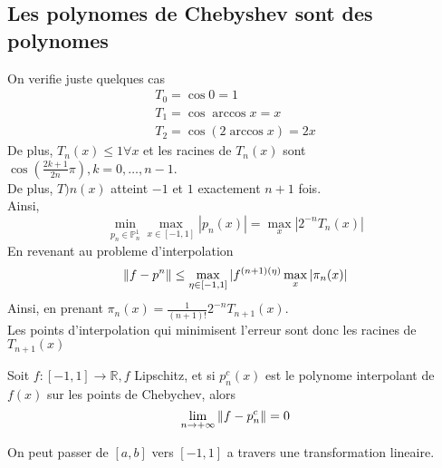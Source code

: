 \documentclass[../main.tex]{subfiles}
\begin{document}
\subsection*{Les polynomes de Chebyshev sont des polynomes}
On verifie juste quelques cas
\begin{align*}
T_0 = \cos 0 = 1\\
T_1 = \cos \arccos x = x\\
T_2 = \cos ( 2 \arccos x ) = 2x
\end{align*}
De plus, $T_n( x) \leq 1\forall x $ et les racines de $T_n( x) $ sont $ \cos( \frac{2k+1}{2n} \pi) , k = 0,\ldots, n-1$.\\
De plus, $T)n( x) $ atteint $-1$ et $1$ exactement $n+1$ fois.\\
Ainsi,
\[ 
	\min_{p_n \in \mathbb{P}_n^{1}} \max _{x\in [ -1,1] } |p_n( x) | = \max_x |2^{-n}T_n( x) |
\]
En revenant au probleme d'interpolation
\[ 
\left\lVert f- p^{n}\right\rVert  \leq \max_{\eta \in [-1,1] } | f^{( n+1) ( \eta) }\max_x |\pi_n( x) |
\]
Ainsi, en prenant $\pi_n( x) = \frac{1}{( n+1) !} 2^{-n}T_{n+1} ( x) $.\\
Les points d'interpolation qui minimisent l'erreur sont donc les racines de $T_{n+1} ( x) $ 
\begin{thm}
	Soit $f: [ -1,1] \to \mathbb{R}, f $ Lipschitz, et si $p_n^{c}( x) $ est le polynome interpolant de $f( x) $ sur les points de Chebychev, alors
	\[ 
	\lim_{n \to  + \infty} \left\lVert f- p_n^{c}\right\rVert = 0
	\]

\end{thm}
\begin{rmq}
On peut passer  de $ [ a,b] $ vers $ [ -1,1] $ a travers une transformation lineaire.
\end{rmq}
\end{document}
